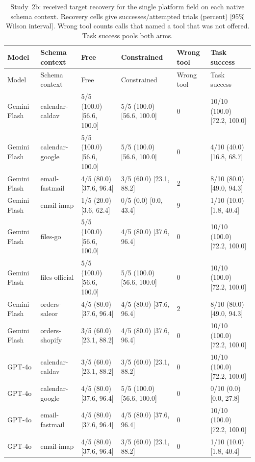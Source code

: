 \begin{center}\scriptsize\setlength{\tabcolsep}{3pt}\begin{longtable}{@{}llllll@{}}
\caption{Study~2b: received target recovery for the single platform field on each native schema context. Recovery cells give successes/attempted trials (percent) [95\% Wilson interval]. Wrong tool counts calls that named a tool that was not offered. Task success pools both arms.}\label{tab:exp25-native}\\
\toprule
Model & Schema context & Free & Constrained & Wrong tool & Task success \\\midrule
\endfirsthead\toprule
Model & Schema context & Free & Constrained & Wrong tool & Task success \\\midrule\endhead
Gemini Flash & calendar-caldav & 5/5 (100.0) [56.6, 100.0] & 5/5 (100.0) [56.6, 100.0] & 0 & 10/10 (100.0) [72.2, 100.0] \\
Gemini Flash & calendar-google & 5/5 (100.0) [56.6, 100.0] & 5/5 (100.0) [56.6, 100.0] & 0 & 4/10 (40.0) [16.8, 68.7] \\
Gemini Flash & email-fastmail & 4/5 (80.0) [37.6, 96.4] & 3/5 (60.0) [23.1, 88.2] & 2 & 8/10 (80.0) [49.0, 94.3] \\
Gemini Flash & email-imap & 1/5 (20.0) [3.6, 62.4] & 0/5 (0.0) [0.0, 43.4] & 9 & 1/10 (10.0) [1.8, 40.4] \\
Gemini Flash & files-go & 5/5 (100.0) [56.6, 100.0] & 4/5 (80.0) [37.6, 96.4] & 0 & 10/10 (100.0) [72.2, 100.0] \\
Gemini Flash & files-official & 5/5 (100.0) [56.6, 100.0] & 5/5 (100.0) [56.6, 100.0] & 0 & 10/10 (100.0) [72.2, 100.0] \\
Gemini Flash & orders-saleor & 4/5 (80.0) [37.6, 96.4] & 4/5 (80.0) [37.6, 96.4] & 2 & 8/10 (80.0) [49.0, 94.3] \\
Gemini Flash & orders-shopify & 3/5 (60.0) [23.1, 88.2] & 4/5 (80.0) [37.6, 96.4] & 0 & 10/10 (100.0) [72.2, 100.0] \\
GPT-4o & calendar-caldav & 3/5 (60.0) [23.1, 88.2] & 3/5 (60.0) [23.1, 88.2] & 0 & 10/10 (100.0) [72.2, 100.0] \\
GPT-4o & calendar-google & 4/5 (80.0) [37.6, 96.4] & 5/5 (100.0) [56.6, 100.0] & 0 & 0/10 (0.0) [0.0, 27.8] \\
GPT-4o & email-fastmail & 4/5 (80.0) [37.6, 96.4] & 4/5 (80.0) [37.6, 96.4] & 0 & 10/10 (100.0) [72.2, 100.0] \\
GPT-4o & email-imap & 4/5 (80.0) [37.6, 96.4] & 3/5 (60.0) [23.1, 88.2] & 0 & 1/10 (10.0) [1.8, 40.4] \\

\end{longtable}
\end{center}
